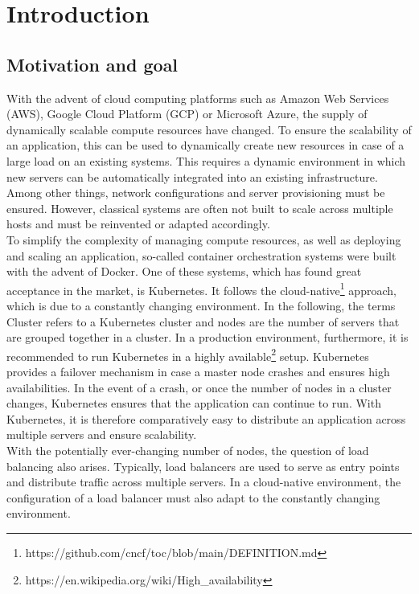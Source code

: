 \chapter{Introduction}


\section{Motivation and goal}
With the advent of cloud computing platforms such as Amazon Web Services (AWS), Google Cloud Platform (GCP) or Microsoft Azure, the supply of dynamically scalable compute resources have changed.
To ensure the scalability of an application, this can be used to dynamically create new resources in case of a large load on an existing systems.
This requires a dynamic environment in which new servers can be automatically integrated into an existing infrastructure.
Among other things, network configurations and server provisioning must be ensured.
However, classical systems are often not built to scale across multiple hosts and must be reinvented or adapted accordingly.
\\
To simplify the complexity of managing compute resources, as well as deploying and scaling an application, so-called container orchestration systems were built with the advent of Docker.
One of these systems, which has found great acceptance in the market, is Kubernetes.
It follows the cloud-native\footnote{https://github.com/cncf/toc/blob/main/DEFINITION.md} approach, which is due to a constantly changing environment.
In the following, the terms Cluster refers to a Kubernetes cluster and nodes are the number of servers that are grouped together in a cluster.
In a production environment, furthermore, it is recommended to run Kubernetes in a highly available\footnote{https://en.wikipedia.org/wiki/High\_availability} setup.
Kubernetes provides a failover mechanism in case a master node crashes and ensures high availabilities.
In the event of a crash, or once the number of nodes in a cluster changes, Kubernetes ensures that the application can continue to run.
With Kubernetes, it is therefore comparatively easy to distribute an application across multiple servers and ensure scalability.
\\
With the potentially ever-changing number of nodes, the question of load balancing also arises.
Typically, load balancers are used to serve as entry points and distribute traffic across multiple servers.
In a cloud-native environment, the configuration of a load balancer must also adapt to the constantly changing environment.
